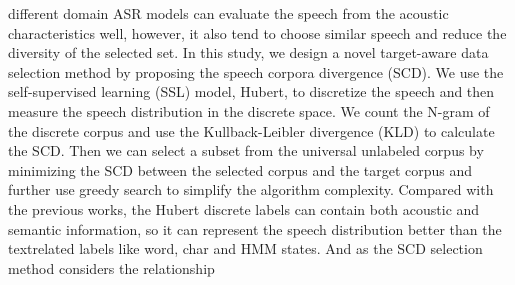 different domain ASR models can evaluate the speech from the
acoustic characteristics well, however, it also tend to choose
similar speech and reduce the diversity of the selected set.
In this study, we design a novel target-aware data selection
method by proposing the speech corpora divergence (SCD).
We use the self-supervised learning (SSL) model, Hubert\cite{hubert}, to discretize the speech and then measure the speech
distribution in the discrete space. We count the N-gram of
the discrete corpus and use the Kullback-Leibler divergence
(KLD) to calculate the SCD. Then we can select a subset
from the universal unlabeled corpus by minimizing the SCD
between the selected corpus and the target corpus and further use greedy search to simplify the algorithm complexity.
Compared with the previous works, the Hubert discrete labels
can contain both acoustic and semantic information, so it
can represent the speech distribution better than the textrelated labels like word, char and HMM states. And as the
SCD selection method considers the relationship 

